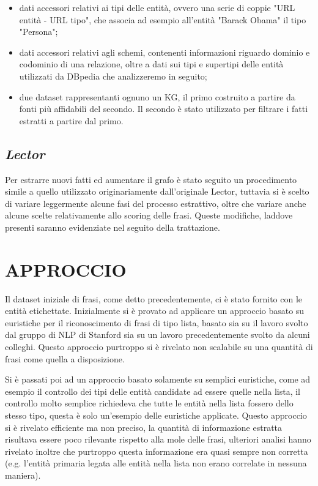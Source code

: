 \documentclass[10pt,a4paper,twocolumn]{article}
\begin{document}
\begin{itemize}
\item dati accessori relativi ai tipi delle entità, ovvero una serie di coppie "URL entità - URL tipo", che associa ad esempio all'entità "Barack Obama" il tipo "Persona";

\item dati accessori relativi agli schemi, contenenti informazioni riguardo dominio e codominio di una relazione, oltre a dati sui tipi e supertipi delle entità utilizzati da DBpedia che analizzeremo in seguito;

\item due dataset rappresentanti ognuno un KG, il primo costruito a partire da fonti più affidabili del secondo. Il secondo è stato utilizzato per filtrare i fatti estratti a partire dal primo.
\end{itemize}

\subsection*{\textit{Lector}}

Per estrarre nuovi fatti ed aumentare il grafo è stato seguito un procedimento simile a quello utilizzato originariamente dall'originale  Lector, tuttavia si è scelto di variare leggermente alcune fasi del processo estrattivo, oltre che variare anche alcune scelte relativamente allo scoring delle frasi. Queste modifiche, laddove presenti saranno evidenziate nel seguito della trattazione.

\section{APPROCCIO}

Il dataset iniziale di frasi, come detto precedentemente, ci è stato fornito con le entità etichettate. Inizialmente si è provato ad applicare un approccio basato su euristiche per il riconoscimento di frasi di tipo lista, basato sia su il lavoro svolto dal gruppo di NLP di Stanford sia su un lavoro precedentemente svolto da alcuni colleghi. Questo approccio purtroppo si è rivelato non scalabile su una quantità di frasi come quella a disposizione. 

Si è passati poi ad un approccio basato solamente su semplici euristiche, come ad esempio il controllo dei tipi delle entità candidate ad essere quelle nella lista, il controllo molto semplice richiedeva che tutte le entità nella lista fossero dello stesso tipo, questa è solo un'esempio delle euristiche applicate. Questo approccio si è rivelato efficiente ma non preciso, la quantità di informazione estratta risultava essere poco rilevante rispetto alla mole delle frasi, ulteriori analisi hanno rivelato inoltre che purtroppo questa informazione era quasi sempre non corretta (e.g. l'entità primaria legata alle entità nella lista non erano correlate in nessuna maniera).
\end{document}
